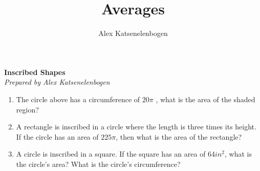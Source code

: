 \documentclass{article}
\title{Averages}
\author{Alex Katsenelenbogen}
\begin{document}
\begin{center}
      \Large\textbf{Inscribed Shapes}\\
      \large\textit{Prepared by Alex Katsenelenbogen}
\end{center}

\vspace{10 mm}



\begin{center}
\end{center}
\begin{enumerate}
\item The circle above has a circumference of $20\pi$ , what is the area of the shaded region?
\item A rectangle is inscribed in a circle where the length is three times its height. If the circle has an area of $225\pi$, then what is the area of the rectangle?
\item A circle is inscribed in a square. If the square has an area of 64$in^2$, what is the circle's area? What is the circle's circumference?
\end{enumerate}
\end{document}

